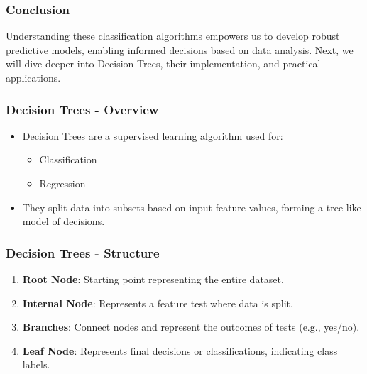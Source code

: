 \documentclass[aspectratio=169]{beamer}
\begin{document}
\begin{frame}[fragile]
    \frametitle{Conclusion}
    Understanding these classification algorithms empowers us to develop robust predictive models, enabling informed decisions based on data analysis. Next, we will dive deeper into Decision Trees, their implementation, and practical applications.
\end{frame}

\begin{frame}[fragile]
    \frametitle{Decision Trees - Overview}
    \begin{itemize}
        \item Decision Trees are a supervised learning algorithm used for:
        \begin{itemize}
            \item Classification
            \item Regression
        \end{itemize}
        \item They split data into subsets based on input feature values, forming a tree-like model of decisions.
    \end{itemize}
\end{frame}

\begin{frame}[fragile]
    \frametitle{Decision Trees - Structure}
    \begin{enumerate}
        \item \textbf{Root Node}: Starting point representing the entire dataset.
        \item \textbf{Internal Node}: Represents a feature test where data is split.
        \item \textbf{Branches}: Connect nodes and represent the outcomes of tests (e.g., yes/no).
        \item \textbf{Leaf Node}: Represents final decisions or classifications, indicating class labels.
    \end{enumerate}
\end{frame}
\end{document}
